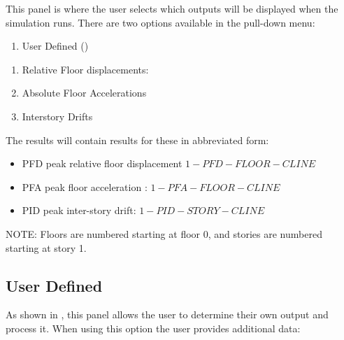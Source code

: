This panel is where the user selects which outputs will be displayed when
the simulation runs. There are two options available in the pull-down
menu:
\begin{enumerate}
\item User Defined ()
\end{enumerate}

\begin{enumerate}
\item Relative Floor displacements:
\item Absolute Floor Accelerations
\item Interstory Drifts
\end{enumerate}

The results will contain results for these in abbreviated form:
\begin{itemize}
\item PFD peak relative floor displacement $1-PFD-FLOOR-CLINE$
\item PFA peak floor acceleration :
  $1-PFA-FLOOR-CLINE$
\item PID peak inter-story drift: $1-PID-STORY-CLINE$
\end{itemize}

NOTE: Floors are numbered starting at floor 0, and stories are numbered starting at story 1.

\subsection{User Defined}\label{subsec:sectionUserDefined}
As shown in , this panel allows the user to determine their own output and process it. When using this option the user provides additional data:

